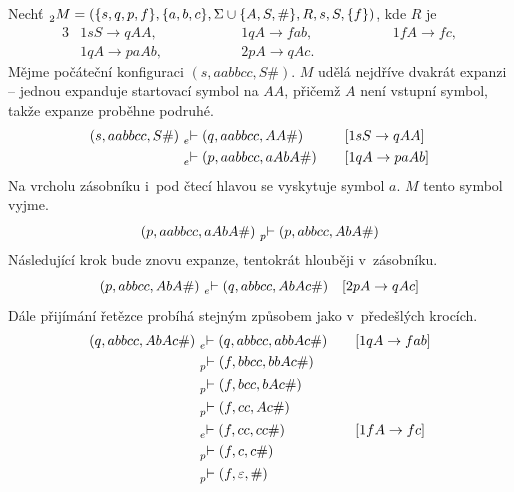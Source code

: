 \begin{example}\label{example_rza}
    Nechť $\prescript{}{2}{M} = (\{s, q, p, f\}, \{a, b, c\}, \Sigma \cup \{A, S, \#\}, R, s, S, \{f\})$, kde $R$ je
    \begin{alignat*}{3}
        & 1sS \rightarrow qAA, \qquad \qquad && 1qA \rightarrow fab, \qquad \qquad && 1fA \rightarrow fc, \\
        & 1qA \rightarrow paAb, \qquad \qquad && 2pA \rightarrow qAc. \qquad \qquad &&
    \end{alignat*}
    Mějme počáteční konfiguraci $(s, aabbcc, S\#)$.
    $M$ udělá nejdříve dvakrát expanzi -- jednou expanduje startovací symbol na $AA$, přičemž $A$ není vstupní symbol, takže expanze proběhne podruhé.
    \begin{alignat*}{2}
        (s, aabbcc, S\#)\, &\prescript{}{e}{\vdash}\; (q, aabbcc, AA\#) \quad && [1sS \rightarrow qAA] \\
                           &\prescript{}{e}{\vdash}\; (p, aabbcc, aAbA\#) \quad && [1qA \rightarrow paAb] \\
    \end{alignat*}
    Na vrcholu zásobníku i~pod čtecí hlavou se vyskytuje symbol $a$.
    $M$ tento symbol vyjme.
    \begin{equation*}
        (p, aabbcc, aAbA\#)\, \prescript{}{p}{\vdash}\; (p, abbcc, AbA\#)
    \end{equation*}
    Následující krok bude znovu expanze, tentokrát hlouběji v~zásobníku.
    \begin{equation*}
        (p, abbcc, AbA\#)\, \prescript{}{e}{\vdash}\; (q, abbcc, AbAc\#) \quad [2pA \rightarrow qAc]
    \end{equation*}
    Dále přijímání řetězce probíhá stejným způsobem jako v~předešlých krocích.
    \begin{alignat*}{2}
        (q, abbcc, AbAc\#)\, &\prescript{}{e}{\vdash}\; (q, abbcc, abbAc\#) \quad && [1qA \rightarrow fab] \\
                             &\prescript{}{p}{\vdash}\; (f, bbcc, bbAc\#) \quad && \\
                             &\prescript{}{p}{\vdash}\; (f, bcc, bAc\#) \quad && \\
                             &\prescript{}{p}{\vdash}\; (f, cc, Ac\#) \quad && \\
                             &\prescript{}{e}{\vdash}\; (f, cc, cc\#) \quad && [1fA \rightarrow fc] \\ 
                             &\prescript{}{p}{\vdash}\; (f, c, c\#) \quad && \\
                             &\prescript{}{p}{\vdash}\; (f, \varepsilon, \#) \quad &&
    \end{alignat*}
\end{example}

